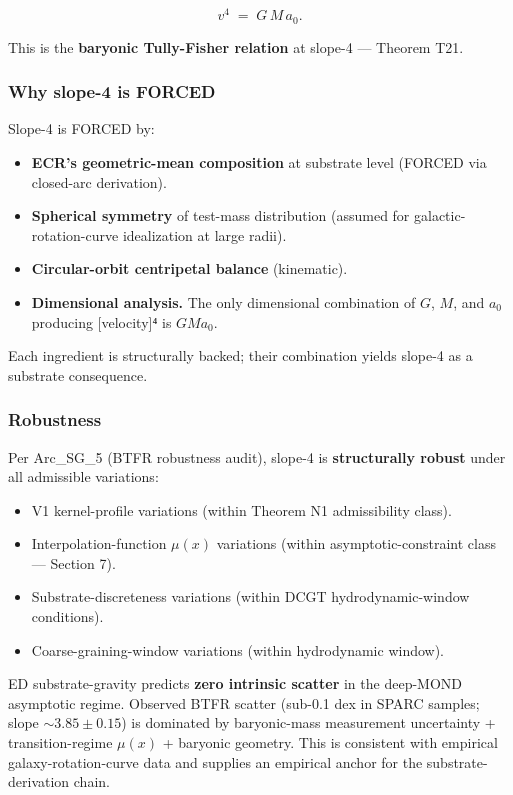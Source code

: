 \documentclass[
]{article}
\providecommand{\tightlist}{%
  \setlength{\itemsep}{0pt}\setlength{\parskip}{0pt}}
\begin{document}
\[\boxed{\;v^4 \;=\; G\,M\,a_0.\;}\]

This is the \textbf{baryonic Tully-Fisher relation} at slope-4 ---
Theorem T21.

\subsubsection{Why slope-4 is FORCED}\label{why-slope-4-is-forced}

Slope-4 is FORCED by:

\begin{itemize}
\tightlist
\item
  \textbf{ECR's geometric-mean composition} at substrate level (FORCED
  via closed-arc derivation).
\item
  \textbf{Spherical symmetry} of test-mass distribution (assumed for
  galactic-rotation-curve idealization at large radii).
\item
  \textbf{Circular-orbit centripetal balance} (kinematic).
\item
  \textbf{Dimensional analysis.} The only dimensional combination of
  \(G\), \(M\), and \(a_0\) producing {[}velocity{]}⁴ is \(GMa_0\).
\end{itemize}

Each ingredient is structurally backed; their combination yields slope-4
as a substrate consequence.

\subsubsection{Robustness}\label{robustness}

Per Arc\_SG\_5 (BTFR robustness audit), slope-4 is \textbf{structurally
robust} under all admissible variations:

\begin{itemize}
\tightlist
\item
  V1 kernel-profile variations (within Theorem N1 admissibility class).
\item
  Interpolation-function \(\mu(x)\) variations (within
  asymptotic-constraint class --- Section 7).
\item
  Substrate-discreteness variations (within DCGT hydrodynamic-window
  conditions).
\item
  Coarse-graining-window variations (within hydrodynamic window).
\end{itemize}

ED substrate-gravity predicts \textbf{zero intrinsic scatter} in the
deep-MOND asymptotic regime. Observed BTFR scatter (sub-0.1 dex in SPARC
samples; slope \(\sim 3.85 \pm 0.15\)) is dominated by baryonic-mass
measurement uncertainty + transition-regime \(\mu(x)\) + baryonic
geometry. This is consistent with empirical galaxy-rotation-curve data
and supplies an empirical anchor for the substrate-derivation chain.
\end{document}
